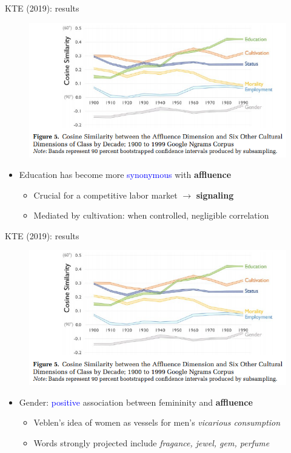 \documentclass[usenames,dvipsnames,english]{beamer}
\begin{document}
\begin{frame}{KTE (2019): results}
\begin{figure}
    \centering
    \includegraphics[scale = 0.5]{Images/kte_validation4.png}
    \end{figure}
\begin{itemize}
    \item Education has become more \textcolor{blue}{synonymous} with \textbf{affluence}
    \begin{itemize}
\vspace{6pt}
    \setlength{\itemsep}{0.6em}
        \item Crucial for a competitive labor market $\rightarrow$ \textbf{signaling}
        \item Mediated by cultivation: when controlled, negligible correlation
    \end{itemize}
\end{itemize}
\end{frame}
\begin{frame}{KTE (2019): results}
\begin{figure}
    \centering
    \includegraphics[scale = 0.5]{Images/kte_validation4.png}
    \end{figure}
\begin{itemize}
    \item Gender: \textcolor{blue}{positive} association between femininity and \textbf{affluence}
    \begin{itemize}
\vspace{6pt}
    \setlength{\itemsep}{0.6em}
        \item Veblen's idea of women as vessels for men's \textit{vicarious consumption}
        \item Words strongly projected include \textit{fragance, jewel, gem, perfume}
    \end{itemize}
\end{itemize}
\end{frame}
\end{document}
